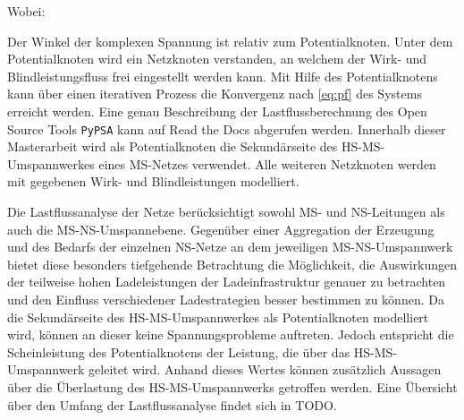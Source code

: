 \noindent Wobei:


Der Winkel der komplexen Spannung ist relativ zum Potentialknoten.
Unter dem Potentialknoten wird ein Netzknoten verstanden, an welchem der Wirk- und Blindleistungsfluss frei eingestellt werden kann.
Mit Hilfe des Potentialknotens kann über einen iterativen Prozess die Konvergenz nach \autoref{eq:pf} des Systems erreicht werden.
Eine genau Beschreibung der Lastflussberechnung des Open Source Tools \texttt{PyPSA} kann auf Read the Docs \cite{Brown2020a} abgerufen werden.
Innerhalb dieser Masterarbeit wird als Potentialknoten die Sekundärseite des \gls{HS}-\gls{MS}-Umspannwerkes eines \gls{MS}-Netzes verwendet.
Alle weiteren Netzknoten werden mit gegebenen Wirk- und Blindleistungen modelliert. \cite{Schachler}\medskip

Die Lastflussanalyse der Netze berücksichtigt sowohl \gls{MS}- und \gls{NS}-Leitungen als auch die \gls{MS}-\gls{NS}-Umspannebene.
Gegenüber einer Aggregation der Erzeugung und des Bedarfs der einzelnen \gls{NS}-Netze an dem jeweiligen \gls{MS}-\gls{NS}-Umspannwerk bietet diese besonders tiefgehende Betrachtung die Möglichkeit, die Auswirkungen der teilweise hohen Ladeleistungen der Ladeinfrastruktur genauer zu betrachten und den Einfluss verschiedener Ladestrategien besser bestimmen zu können.
Da die Sekundärseite des \gls{HS}-\gls{MS}-Umspannwerkes als Potentialknoten modelliert wird, können an dieser keine Spannungsprobleme auftreten.
Jedoch entspricht die Scheinleistung des Potentialknotens der Leistung, die über das \gls{HS}-\gls{MS}-Umspannwerk geleitet wird.
Anhand dieses Wertes können zusätzlich Aussagen über die Überlastung des \gls{HS}-\gls{MS}-Umspannwerks getroffen werden.
Eine Übersicht über den Umfang der Lastflussanalyse findet sich in {\color{red} TODO}. \cite{Schachler}

